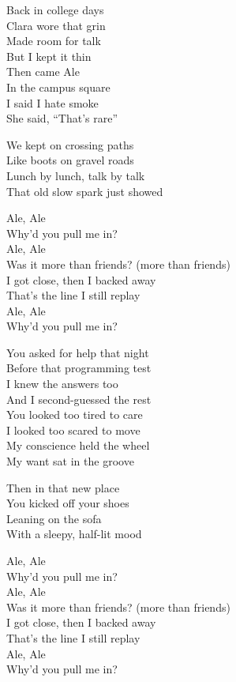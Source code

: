 \begin{lyrics}

Back in college days\\
Clara wore that grin\\
Made room for talk\\
But I kept it thin\\
Then came Ale\\
In the campus square\\
I said I hate smoke\\
She said, “That’s rare”

We kept on crossing paths\\
Like boots on gravel roads\\
Lunch by lunch, talk by talk\\
That old slow spark just showed

Ale, Ale\\
Why’d you pull me in?\\
Ale, Ale\\
Was it more than friends? (more than friends)\\
I got close, then I backed away\\
That’s the line I still replay\\
Ale, Ale\\
Why’d you pull me in?

You asked for help that night\\
Before that programming test\\
I knew the answers too\\
And I second-guessed the rest\\
You looked too tired to care\\
I looked too scared to move\\
My conscience held the wheel\\
My want sat in the groove

Then in that new place\\
You kicked off your shoes\\
Leaning on the sofa\\
With a sleepy, half-lit mood

Ale, Ale\\
Why’d you pull me in?\\
Ale, Ale\\
Was it more than friends? (more than friends)\\
I got close, then I backed away\\
That’s the line I still replay\\
Ale, Ale\\
Why’d you pull me in?


\end{lyrics}
